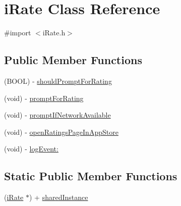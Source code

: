 \hypertarget{interfacei_rate}{
\section{i\-Rate \-Class \-Reference}
\label{interfacei_rate}
}


{\ttfamily \#import $<$i\-Rate.\-h$>$}

\subsection*{\-Public \-Member \-Functions}
\begin{DoxyCompactItemize}
\item 
(\-B\-O\-O\-L) -\/ \hyperlink{interfacei_rate_aa7d745876e12d9838dab76d6b8fac6aa}{should\-Prompt\-For\-Rating}
\item 
(void) -\/ \hyperlink{interfacei_rate_ac7db9ee1dc63b3086c2a27c153da4bd8}{prompt\-For\-Rating}
\item 
(void) -\/ \hyperlink{interfacei_rate_a98ddf7e94693b59dc5aa3fa656127f84}{prompt\-If\-Network\-Available}
\item 
(void) -\/ \hyperlink{interfacei_rate_addbdefc156bfc542208ec75f5a052fa2}{open\-Ratings\-Page\-In\-App\-Store}
\item 
(void) -\/ \hyperlink{interfacei_rate_a3a2492fd8b91e7f01be81a05a2fec6ac}{log\-Event\-:}
\end{DoxyCompactItemize}
\subsection*{\-Static \-Public \-Member \-Functions}
\begin{DoxyCompactItemize}
\item 
(\hyperlink{interfacei_rate}{i\-Rate} $\ast$) + \hyperlink{interfacei_rate_a76fccb9aace4c52dcd649ec314f6c402}{shared\-Instance}
\end{DoxyCompactItemize}
